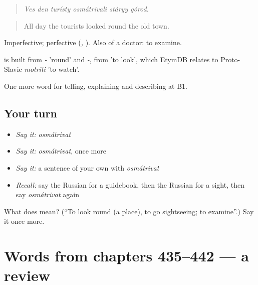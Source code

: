 \begin{quote}
\emph{Ves den turísty osmátrivali stáryy górod.}
\end{quote}

\begin{quote}
All day the tourists looked round the old town.
\end{quote}

Imperfective; perfective \emph{} (\emph{, }). Also of a doctor: to examine.

\begin{cousinweb}
\emph{} is built from \emph{-} 'round' and \emph{-}, from \emph{} 'to look', which EtymDB relates to Proto-Slavic \emph{motriti} 'to watch'.
\end{cousinweb}

\begin{grammarlens}[title={What you've built}]
One more word for telling, explaining and describing at B1.
\end{grammarlens}

\subsection*{Your turn}
\begin{itemize}
\raggedright
  \item \emph{Say it:} \emph{osmátrivat}
  \item \emph{Say it:} \emph{osmátrivat}, once more
  \item \emph{Say it:} a sentence of your own with \emph{osmátrivat}
  \item \emph{Recall:} say the Russian for a guidebook, then the Russian for a sight, then say \emph{osmátrivat} again
\end{itemize}

\begin{tcolorbox}[breakable,colback=teal!4,colframe=teal!35!black,title={Before you move on}]
What does  mean? (\textquotedblleft{}To look round (a place), to go sightseeing; to examine\textquotedblright{}.) Say it once more.
\end{tcolorbox}
\section[(dialogue)]{Words from chapters 435–442 — a review}

\label{lesson:RU-R442-review-435-442}



